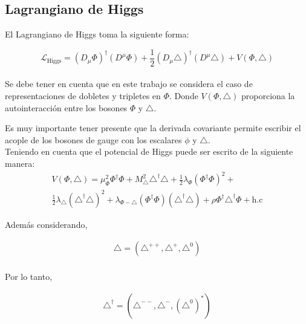 \documentclass[12pt]{article}
\begin{document}

\subsection{Lagrangiano de Higgs}
El Lagrangiano de Higgs toma la siguiente forma: 

\begin{equation}
    \mathcal{L}_{\text{Higgs}}= (D_\mu\Phi)^\dagger(D^\mu\Phi)+ \frac{1}{2}(D_\mu\triangle)^\dagger(D^\mu\triangle) + V(\Phi, \triangle)
    \label{eq:Higgs}
\end{equation} \\

 Se debe tener en cuenta que en este trabajo se considera el caso de representaciones de dobletes y tripletes en \(\Phi\). Donde $ V(\Phi, \triangle)$  proporciona la autointeracción entre los bosones \(\Phi\) y \(\triangle\). 
 
Es muy importante tener presente que la derivada covariante permite escribir el acople de los bosones de gauge con los escalares \(\phi\) y \(\triangle\). \\

Teniendo en cuenta que el potencial de Higgs puede ser escrito de la siguiente manera: \\

\begin{equation}
    \begin{aligned}
    \label{eq:POtencialMAjorana}
V(\Phi, \triangle)= \mu^2_\Phi\Phi^\dagger\Phi + M^2_\triangle\triangle^\dagger\triangle +  \frac{1}{2}\lambda_\Phi (\Phi^\dagger\Phi)^2 + \\ 
\frac{1}{2}\lambda_\triangle (\triangle^\dagger\triangle)^2 + \lambda_{\Phi-\triangle} (\Phi^\dagger\Phi)(\triangle^\dagger\triangle)+ \rho\Phi^\dagger\triangle^\dagger\Phi + \text{h.c}
    \end{aligned}
\end{equation}

Además considerando,  
 
\begin{equation}
\begin{aligned}
 \triangle= (\triangle^{++}   , \triangle^{+}  ,  \triangle^{0} )  \\ 
\end{aligned}
\end{equation}

Por lo tanto, 

\begin{equation}
\begin{aligned}
 \triangle^\dagger = (  \triangle^{--}  , \triangle^{-}  , (\triangle^{0})^*    )\\ 
\end{aligned}
\end{equation} \\
\end{document}
